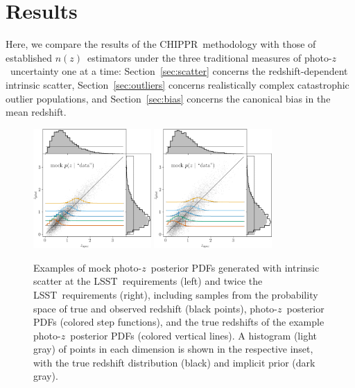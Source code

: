 \documentclass[iop]{emulateapj}
\newcommand{\Sect}[1]{Section~\ref{#1}}
\newcommand{\project}[1]{\textsc{#1}}
\newcommand{\lsst}{\project{LSST}}
\newcommand{\Chippr}{\project{CHIPPR}}
\newcommand{\pz}{photo-$z$}
\newcommand{\pzpdf}{\pz\ posterior PDF}
\newcommand{\nz}{$n(z)$}
\begin{document}
\section{Results}
\label{sec:alldata}

Here, we compare the results of the \Chippr\ methodology with those of established \nz\ estimators under the three traditional measures of \pz\ uncertainty one at a time:
\Sect{sec:scatter} concerns the redshift-dependent intrinsic scatter, \Sect{sec:outliers} concerns realistically complex catastrophic outlier populations, and \Sect{sec:bias} concerns the canonical bias in the mean redshift.

\begin{figure}
	\begin{center}
		\includegraphics[width=0.4\textwidth]{data_scatter_lo.png}
		\includegraphics[width=0.4\textwidth]{data_scatter_hi.png}
		\caption{
			Examples of mock \pzpdf s generated with intrinsic scatter at the \lsst\ requirements (left) and twice the \lsst\ requirements (right), including samples from the probability space of true and observed redshift (black points), \pzpdf s (colored step functions), and the true redshifts of the example \pzpdf s (colored vertical lines).
			A histogram (light gray) of points in each dimension is shown in the respective inset, with the true redshift distribution (black) and implicit prior (dark gray).
		}
		\label{fig:pzs-scatter}
	\end{center}
\end{figure}
\end{document}
